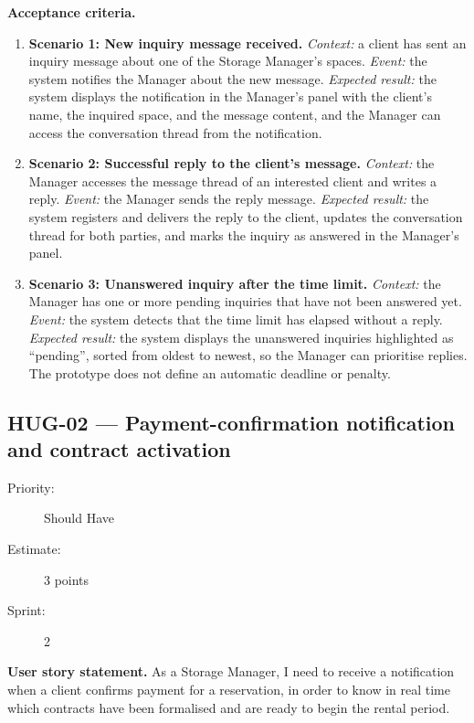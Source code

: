 \documentclass[11pt,a4paper,oneside]{report}
\begin{document}
\textbf{Acceptance criteria.}
\begin{enumerate}
\item \textbf{Scenario 1: New inquiry message received.} \emph{Context:} a client has sent an inquiry message about one of the Storage Manager's spaces. \emph{Event:} the system notifies the Manager about the new message. \emph{Expected result:} the system displays the notification in the Manager's panel with the client's name, the inquired space, and the message content, and the Manager can access the conversation thread from the notification.
\item \textbf{Scenario 2: Successful reply to the client's message.} \emph{Context:} the Manager accesses the message thread of an interested client and writes a reply. \emph{Event:} the Manager sends the reply message. \emph{Expected result:} the system registers and delivers the reply to the client, updates the conversation thread for both parties, and marks the inquiry as answered in the Manager's panel.
\item \textbf{Scenario 3: Unanswered inquiry after the time limit.} \emph{Context:} the Manager has one or more pending inquiries that have not been answered yet. \emph{Event:} the system detects that the time limit has elapsed without a reply. \emph{Expected result:} the system displays the unanswered inquiries highlighted as ``pending'', sorted from oldest to newest, so the Manager can prioritise replies. The prototype does not define an automatic deadline or penalty.
\end{enumerate}

\subsection{HUG-02 --- Payment-confirmation notification and contract activation}
\label{req:HUG-02}
\begin{description}
\item[Priority:] Should Have \quad \item[Estimate:] 3 points \quad \item[Sprint:] 2
\end{description}

\textbf{User story statement.} As a Storage Manager, I need to receive a notification when a client confirms payment for a reservation, in order to know in real time which contracts have been formalised and are ready to begin the rental period.
\end{document}
